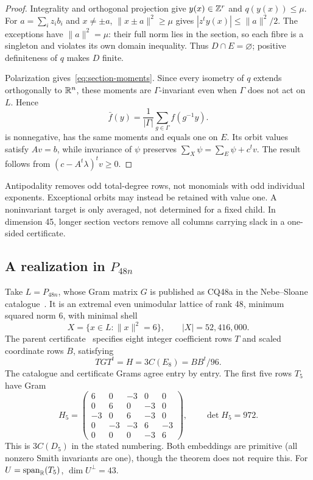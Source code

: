 \begin{proof}
Integrality and orthogonal projection give $y(x)\in\mathbb Z^r$ and
$q(y(x))\le\mu$. For $a=\sum_i z_i b_i$ and $x\ne\pm a$,
$\|x\pm a\|^2\ge\mu$ gives $|z^ty(x)|\le\|a\|^2/2$.
The exceptions have $\|a\|^2=\mu$: their full norm lies in the
section, so each fibre is a singleton and violates its own domain
inequality. Thus $D\cap E=\varnothing$; positive definiteness of $q$
makes $D$ finite.

Polarization gives~\eqref{eq:section-moments}. Since every isometry of
$q$ extends orthogonally to $\mathbb R^n$, these moments are $\Gamma$-invariant
even when $\Gamma$ does not act on $L$. Hence
\[
\bar f(y)=\frac1{|\Gamma|}\sum_{g\in\Gamma}f(g^{-1}y).
\]
is nonnegative, has the same moments and equals one on $E$.
Its orbit values satisfy $Av=b$, while invariance of $\psi$ preserves
$\sum_X\psi=\sum_E\psi+c^tv$. The result follows from
$(c-A^t\lambda)^tv\ge0$.
\end{proof}

Antipodality removes odd total-degree rows, not monomials with odd
individual exponents. Exceptional orbits may instead be retained with
value one. A noninvariant target is only averaged, not determined for a
fixed child. In dimension 45, longer section vectors remove all columns
carrying slack in a one-sided certificate.

\subsection{A realization in \texorpdfstring{$P_{48n}$}{P48n}}
Take $L=P_{48n}$, whose Gram matrix $G$ is published as CQ48a
in the Nebe--Sloane catalogue~\cite{latticecatalogue}. It is an extremal even
unimodular lattice of rank 48, minimum squared norm 6, with minimal shell
\[
X=\{x\in L:\|x\|^2=6\},\qquad |X|=52,416,000.
\]
The parent certificate~\cite{crosssections} specifies eight integer
coefficient rows $T$ and scaled coordinate rows $B$,
satisfying
\begin{equation}\label{d43:eq:embedding}
 TGT^t=H=3C(E_8)=BB^t/96.
\end{equation}
The catalogue and certificate Grams agree entry by entry. The first five
rows $T_5$ have Gram
\begin{equation}\label{d43:eq:d5}
H_5=\begin{pmatrix}
6&0&-3&0&0\\0&6&0&-3&0\\-3&0&6&-3&0\\
0&-3&-3&6&-3\\0&0&0&-3&6
\end{pmatrix},\qquad \det H_5=972.
\end{equation}
This is $3C(D_5)$ in the stated numbering. Both embeddings are primitive
(all nonzero Smith invariants are one), though the theorem does not
require this. For $U=\operatorname{span}_{\mathbb R}(T_5)$, $\dim U^\perp=43$.

